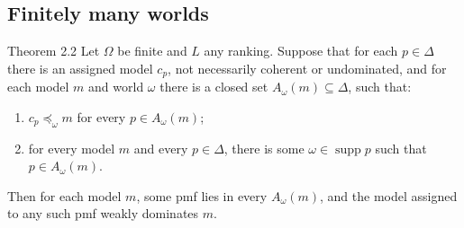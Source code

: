 \documentclass[11pt]{article}
\newcommand{\supp}{\operatorname{supp}}
\begin{document}
\subsection*{Finitely many worlds}
\begin{stmt}{Theorem 2.2}
Let $\Omega$ be finite and $L$ any ranking. Suppose that for each $p\in\Delta$ there is an assigned model $c_p$, not necessarily coherent or undominated, and for each model $m$ and world $\omega$ there is a closed set $A_\omega(m)\subseteq\Delta$, such that:
\begin{enumerate}[label=(\roman*)]
\item $c_p\preceq_\omega m$ for every $p\in A_\omega(m)$;
\item for every model $m$ and every $p\in\Delta$, there is some $\omega\in\supp p$ such that $p\in A_\omega(m)$.
\end{enumerate}
Then for each model $m$, some pmf lies in every $A_\omega(m)$, and the model assigned to any such pmf weakly dominates $m$.
\end{stmt}
\end{document}
